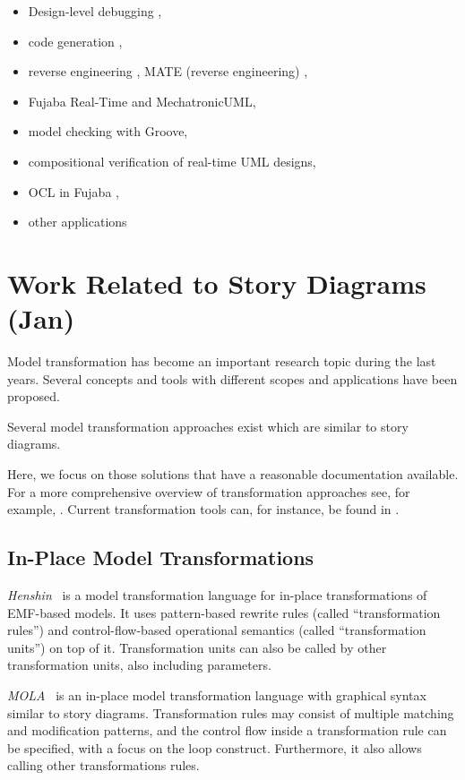 \begin{itemize}
\item Design-level debugging \cite{GZ02,Gei02,GZ06},
\item code generation \cite{GSR05,GBD07},
\item reverse engineering \cite{NSW+02,BGS+Z08}, MATE (reverse engineering) \cite{SKS+07,ST08},
\item Fujaba Real-Time and MechatronicUML,
\item model checking with Groove,
\item compositional verification of real-time UML designs,
\item OCL in Fujaba \cite{SZG07},
\item other applications \cite{KNNZ00,GZ10}
\end{itemize}


\section{Work Related to Story Diagrams (Jan)}

Model transformation has become an important research topic during the last years.
Several concepts and tools with different scopes and applications have been proposed.

Several model transformation approaches exist which are similar to story diagrams.

Here, we focus on those solutions that have a reasonable documentation available.
For a more comprehensive overview of transformation approaches see, for example, \cite{Czarnecki06}.
Current transformation tools can, for instance, be found in \cite{TTC2010}.

\subsection{In-Place Model Transformations}

\emph{Henshin}~\cite{henshin2} is a model transformation language for in-place transformations of EMF-based models.
It uses pattern-based rewrite rules (called ``transformation rules'') and control-flow-based operational semantics (called ``transformation units'') on top of it.
Transformation units can also be called by other transformation units, also including parameters.

\emph{MOLA}~\cite{mola} is an in-place model transformation language with graphical syntax similar to story diagrams.
Transformation rules may consist of multiple matching and modification patterns, and the control flow inside a transformation rule can be specified, with a focus on the loop construct.
Furthermore, it also allows calling other transformations rules. %


